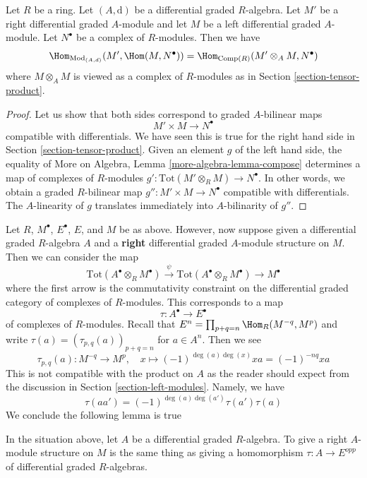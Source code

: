 \begin{lemma}
\label{lemma-characterize-hom}
Let $R$ be a ring. Let $(A, \text{d})$ be a differential graded $R$-algebra.
Let $M'$ be a right differential graded $A$-module and let
$M$ be a left differential graded $A$-module.
Let $N^\bullet$ be a complex of $R$-modules. Then we have
$$
\Hom_{\text{Mod}_{(A, d)}}(M', \Hom(M, N^\bullet)) =
\Hom_{\text{Comp}(R)}(M' \otimes_A M, N^\bullet)
$$
where $M \otimes_A M$ is viewed as a complex of $R$-modules
as in Section \ref{section-tensor-product}.
\end{lemma}

\begin{proof}
Let us show that both sides correspond to graded $A$-bilinear maps
$$
M' \times M \longrightarrow N^\bullet
$$
compatible with differentials. We have seen this is true for the right
hand side in Section \ref{section-tensor-product}. Given an element
$g$ of the left hand side, the equality of
More on Algebra, Lemma \ref{more-algebra-lemma-compose}
determines a map of complexes of $R$-modules
$g' : \text{Tot}(M' \otimes_R M) \to N^\bullet$.
In other words, we obtain a graded $R$-bilinear
map $g'' : M' \times M \to N^\bullet$ compatible with differentials.
The $A$-linearity of $g$ translates immediately
into $A$-bilinarity of $g''$.
\end{proof}

\noindent
Let $R$, $M^\bullet$, $E^\bullet$, $E$, and $M$ be as above.
However, now suppose given a differential graded $R$-algebra $A$
and a {\bf right} differential graded $A$-module structure on $M$.
Then we can consider the map
$$
\text{Tot}(A^\bullet \otimes_R M^\bullet)
\xrightarrow{\psi}
\text{Tot}(A^\bullet \otimes_R M^\bullet)
\to
M^\bullet
$$
where the first arrow is the commutativity constraint on the
differential graded category of complexes of $R$-modules.
This corresponds to a map
$$
\tau : A^\bullet \longrightarrow E^\bullet
$$
of complexes of $R$-modules. Recall that
$E^n = \prod_{p + q = n} \Hom_R(M^{-q}, M^p)$
and write $\tau(a) = (\tau_{p, q}(a))_{p + q = n}$ for $a \in A^n$.
Then we see
$$
\tau_{p, q}(a) : M^{-q} \longrightarrow M^p,\quad
x \longmapsto (-1)^{\deg(a)\deg(x)}x a = (-1)^{-nq}xa
$$
This is not compatible with the product on $A$ as the reader should
expect from the discussion in Section \ref{section-left-modules}.
Namely, we have
$$
\tau(a a') = (-1)^{\deg(a)\deg(a')}\tau(a') \tau(a)
$$
We conclude the following lemma is true

\begin{lemma}
\label{lemma-right-module-structure}
In the situation above, let $A$ be a differential graded $R$-algebra.
To give a right $A$-module structure on $M$ is the same thing as
giving a homomorphism $\tau : A \to E^{opp}$
of differential graded $R$-algebras.
\end{lemma}

